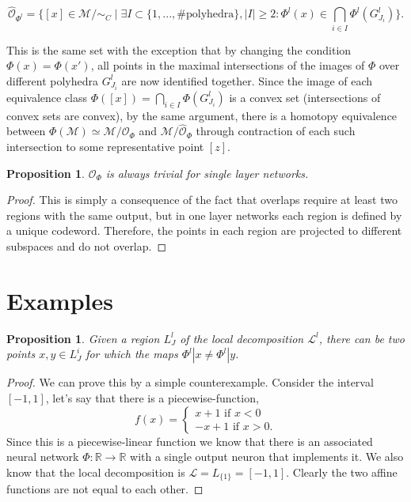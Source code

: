 \documentclass[10pt]{article} %
\theoremstyle{plain}
\newtheorem{proposition}[theorem]{Proposition}
\theoremstyle{definition}
\theoremstyle{remark}
\begin{document}
\begin{equation}
\label{coarse overlap decomp}
    \mathcal{\hat{O}}_{\Phi^l} = \Big\{[x] \in \mathcal{M}/\sim_C \mid \exists I \subset \{1,..., \# \text{polyhedra}\}, |I|\geq 2: \Phi^l(x) \in \bigcap\limits_{i \in I} \Phi^l(G^l_{J_i})\Big \}.
\end{equation}

This is the same set with the exception that by changing the condition $\Phi(x)=\Phi(x')$, all points in the maximal intersections of the images of $\Phi$ over different polyhedra $G_{J_i}^l$ are now identified together. Since {the image of} each equivalence class $\Phi([x]) = \bigcap\limits_{i\in I}\Phi(G^l_{J_i})$ is a convex set (intersections of convex sets are convex), by the same argument, there is a homotopy equivalence between $\Phi(\mathcal{M}) \simeq \mathcal{M}/\mathcal{O}_\Phi$ and $\mathcal{M}/\hat{\mathcal{O}}_\Phi$ through contraction of each such intersection to some representative point $[z]$.

\begin{proposition}
\label{Single layer overlaps}
    $\mathcal{O}_\Phi$ is always trivial for single layer networks.
\end{proposition}

\begin{proof}
    This is simply a consequence of the fact that overlaps require at least two regions with the same output, but in one layer networks each region is defined by a unique codeword. Therefore, the points in each region are projected to different subspaces and do not overlap.
\end{proof}


\newpage

\section{Examples}
\begin{proposition}
\label{proof:loc_affine}
    Given a region $L^l_J$ of the local decomposition $\mathcal{L}^l$, there can be two points $x,y \in L^i_J$ for which the maps $\Phi^l|x \neq \Phi^l|y$.
\end{proposition}

\begin{proof}
    We can prove this by a simple counterexample. Consider the interval $[-1,1]$, let's say that there is a piecewise-function,
    \begin{equation*}
        f(x) = 
        \begin{cases}
            x+1 \text{ if } x<0\\
            -x+1 \text{ if } x > 0.
        \end{cases}
    \end{equation*}
    Since this is a piecewise-linear function we know that there is an associated neural network $\Phi: \mathbb{R} \to \mathbb{R}$ with a single output neuron that implements it. We also know that the local decomposition is $\mathcal{L} = L_{\{1\}} = [-1,1]$. Clearly the two affine functions are not equal to each other.
\end{proof}
\end{document}
